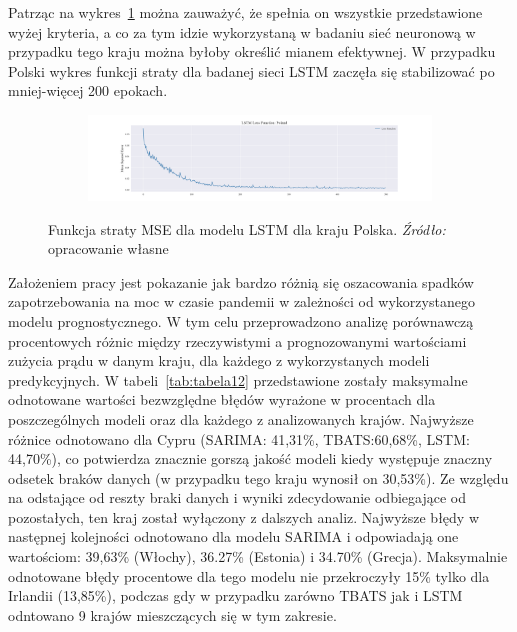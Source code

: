 \documentclass[polish, twoside, 12pt, a4paper]{article}
\theoremstyle{definition}
\theoremstyle{plain}
\theoremstyle{remark}
\begin{document}
Patrząc na wykres~\ref{fig:x14} można zauważyć, że spełnia on wszystkie przedstawione wyżej kryteria, a co za tym idzie wykorzystaną w badaniu sieć neuronową w przypadku tego kraju można byłoby określić mianem efektywnej. W przypadku Polski wykres funkcji straty dla badanej sieci LSTM zaczęła się stabilizować po mniej-więcej 200 epokach.
\begin{figure}[hbt]
  \centering

  \begin{subfigure}[t]{0.95\textwidth}
    \includegraphics[width=\textwidth]{./out_figures/lstm_loss_function_Poland.png}
  \end{subfigure}

  \captionsetup{margin=10pt,font=small,labelfont=bf,width=.8\textwidth}

  \caption[Funkcja straty MSE dla modelu LSTM dla kraju Polska.]{Funkcja straty MSE dla modelu LSTM dla kraju Polska. \textit{Źródło:} opracowanie własne}\label{fig:x14}
\end{figure}

Założeniem pracy jest pokazanie jak bardzo różnią się oszacowania spadków zapotrzebowania na moc w czasie pandemii w zależności od wykorzystanego modelu prognostycznego. W tym celu przeprowadzono analizę porównawczą procentowych różnic między rzeczywistymi a prognozowanymi wartościami zużycia prądu w danym kraju, dla każdego z wykorzystanych modeli predykcyjnych. W tabeli~\ref{tab:tabela12} przedstawione zostały maksymalne odnotowane wartości bezwzględne błędów wyrażone w procentach dla poszczególnych modeli oraz dla każdego z analizowanych krajów. Najwyższe różnice odnotowano dla Cypru (SARIMA: 41,31\%, TBATS:60,68\%, LSTM: 44,70\%), co potwierdza znacznie gorszą jakość modeli kiedy występuje znaczny odsetek braków danych (w przypadku tego kraju wynosił on 30,53\%). Ze względu na odstające od reszty braki danych i wyniki zdecydowanie odbiegające od pozostałych, ten kraj został wyłączony z dalszych analiz. Najwyższe błędy w następnej kolejności odnotowano dla modelu SARIMA i odpowiadają one wartościom: 39,63\% (Włochy), 36.27\% (Estonia) i 34.70\% (Grecja). Maksymalnie odnotowane błędy procentowe dla tego modelu nie przekroczyły 15\% tylko dla Irlandii (13,85\%), podczas gdy w przypadku zarówno TBATS jak i LSTM odntowano 9 krajów mieszczących się w tym zakresie. 
\end{document}
